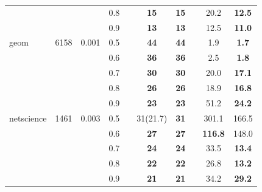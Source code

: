 \begin{table}[h!]
\begin{tabular}{l c c c c c c c c c}
& & & 0.8 & & \textbf{15} & \textbf{15} & & 20.2 & \textbf{12.5} \\
& & & 0.9 & & \textbf{13} & \textbf{13} & & 12.5 & \textbf{11.0} \\
\midrule
geom & 6158 & 0.001 & 0.5 & & \textbf{44} & \textbf{44} & & 1.9 & \textbf{1.7} \\
& & & 0.6 & & \textbf{36} & \textbf{36} & & 2.5 & \textbf{1.8} \\
& & & 0.7 & & \textbf{30} & \textbf{30} & & 20.0 & \textbf{17.1} \\
& & & 0.8 & & \textbf{26} & \textbf{26} & & 18.9 & \textbf{16.8} \\
& & & 0.9 & & \textbf{23} & \textbf{23} & & 51.2 & \textbf{24.2} \\
\midrule
netscience & 1461 & 0.003 & 0.5 & & 31(21.7) & \textbf{31} & & 301.1 & 166.5 \\
& & & 0.6 & & \textbf{27} & \textbf{27} & & \textbf{116.8} & 148.0 \\
& & & 0.7 & & \textbf{24} & \textbf{24} & & 33.5 & \textbf{13.4} \\
& & & 0.8 & & \textbf{22} & \textbf{22} & & 26.8 & \textbf{13.2} \\
& & & 0.9 & & \textbf{21} & \textbf{21} & & 34.2 & \textbf{29.2} \\

    \bottomrule
    \bottomrule
    \end{tabular}
    \end{table}